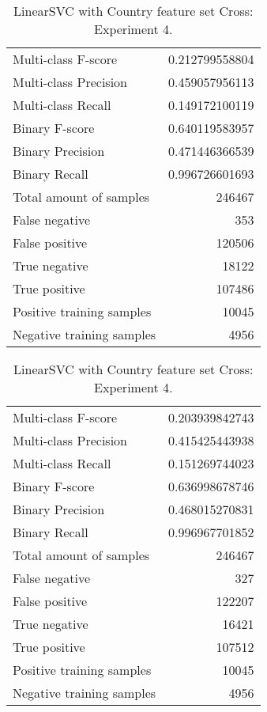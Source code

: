 \begin{table}[H]
\begin{minipage}{0.5\textwidth}
\caption{LinearSVC with Country feature set Cross: Experiment 3.}
\centering
\begin{tabular}{l r}
\toprule
Multi-class F-score & 0.212799558804 \\
Multi-class Precision & 0.459057956113 \\
Multi-class Recall & 0.149172100119 \\
\midrule
Binary F-score & 0.640119583957 \\
Binary Precision & 0.471446366539 \\
Binary Recall & 0.996726601693 \\
\midrule
Total amount of samples & 246467 \\
False negative & 353 \\
False positive & 120506 \\
True negative & 18122 \\
True positive & 107486 \\
\midrule
Positive training samples & 10045 \\
Negative training samples & 4956 \\
\bottomrule
\end{tabular}
\end{minipage}
\hfillx
\begin{minipage}{0.5\textwidth}
\caption{LinearSVC with Country feature set Cross: Experiment 4.}
\centering
\begin{tabular}{l r}
\toprule
Multi-class F-score & 0.203939842743 \\
Multi-class Precision & 0.415425443938 \\
Multi-class Recall & 0.151269744023 \\
\midrule
Binary F-score & 0.636998678746 \\
Binary Precision & 0.468015270831 \\
Binary Recall & 0.996967701852 \\
\midrule
Total amount of samples & 246467 \\
False negative & 327 \\
False positive & 122207 \\
True negative & 16421 \\
True positive & 107512 \\
\midrule
Positive training samples & 10045 \\
Negative training samples & 4956 \\
\bottomrule
\end{tabular}
\end{minipage}
\end{table}
